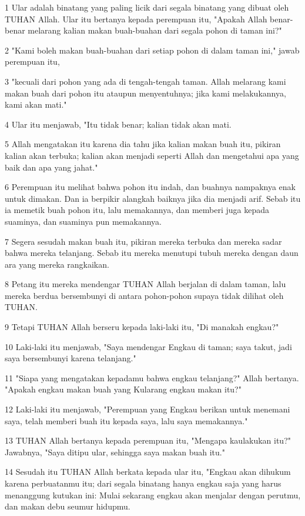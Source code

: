 \par 1 Ular adalah binatang yang paling licik dari segala binatang yang dibuat oleh TUHAN Allah. Ular itu bertanya kepada perempuan itu, "Apakah Allah benar-benar melarang kalian makan buah-buahan dari segala pohon di taman ini?"
\par 2 "Kami boleh makan buah-buahan dari setiap pohon di dalam taman ini," jawab perempuan itu,
\par 3 "kecuali dari pohon yang ada di tengah-tengah taman. Allah melarang kami makan buah dari pohon itu ataupun menyentuhnya; jika kami melakukannya, kami akan mati."
\par 4 Ular itu menjawab, "Itu tidak benar; kalian tidak akan mati.
\par 5 Allah mengatakan itu karena dia tahu jika kalian makan buah itu, pikiran kalian akan terbuka; kalian akan menjadi seperti Allah dan mengetahui apa yang baik dan apa yang jahat."
\par 6 Perempuan itu melihat bahwa pohon itu indah, dan buahnya nampaknya enak untuk dimakan. Dan ia berpikir alangkah baiknya jika dia menjadi arif. Sebab itu ia memetik buah pohon itu, lalu memakannya, dan memberi juga kepada suaminya, dan suaminya pun memakannya.
\par 7 Segera sesudah makan buah itu, pikiran mereka terbuka dan mereka sadar bahwa mereka telanjang. Sebab itu mereka menutupi tubuh mereka dengan daun ara yang mereka rangkaikan.
\par 8 Petang itu mereka mendengar TUHAN Allah berjalan di dalam taman, lalu mereka berdua bersembunyi di antara pohon-pohon supaya tidak dilihat oleh TUHAN.
\par 9 Tetapi TUHAN Allah berseru kepada laki-laki itu, "Di manakah engkau?"
\par 10 Laki-laki itu menjawab, "Saya mendengar Engkau di taman; saya takut, jadi saya bersembunyi karena telanjang."
\par 11 "Siapa yang mengatakan kepadamu bahwa engkau telanjang?" Allah bertanya. "Apakah engkau makan buah yang Kularang engkau makan itu?"
\par 12 Laki-laki itu menjawab, "Perempuan yang Engkau berikan untuk menemani saya, telah memberi buah itu kepada saya, lalu saya memakannya."
\par 13 TUHAN Allah bertanya kepada perempuan itu, "Mengapa kaulakukan itu?" Jawabnya, "Saya ditipu ular, sehingga saya makan buah itu."
\par 14 Sesudah itu TUHAN Allah berkata kepada ular itu, "Engkau akan dihukum karena perbuatanmu itu; dari segala binatang hanya engkau saja yang harus menanggung kutukan ini: Mulai sekarang engkau akan menjalar dengan perutmu, dan makan debu seumur hidupmu.
